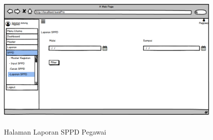 \begin{enumerate}
\begin{enumerate}
		\begin{figure}
			\centering
			\includegraphics [height= 7cm, width=11cm]{konten/gambar/WireFrameSistemSurat/Pegawai/LaporanSPPD.png}
			\caption{Halaman Laporan SPPD Pegawai}
			\label{HalamanLaporanSPPDPegawai}
		\end{figure}
	\end{enumerate}
\end{enumerate}

